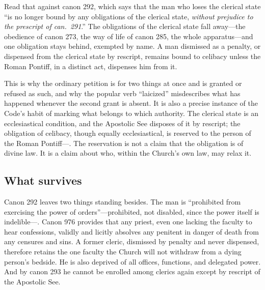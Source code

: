 Read that against canon 292, which says that the man who loses the clerical state ``is no longer bound by any obligations of the clerical state, \emph{without prejudice to the prescript of can.~291}.'' The obligations of the clerical state fall away---the obedience of canon 273, the way of life of canon 285, the whole apparatus---and one obligation stays behind, exempted by name. A man dismissed as a penalty, or dispensed from the clerical state by rescript, remains bound to celibacy unless the Roman Pontiff, in a distinct act, dispenses him from it.

This is why the ordinary petition is for two things at once and is granted or refused as such, and why the popular verb ``laicized'' misdescribes what has happened whenever the second grant is absent. It is also a precise instance of the Code's habit of marking what belongs to which authority. The clerical state is an ecclesiastical condition, and the Apostolic See disposes of it by rescript; the obligation of celibacy, though equally ecclesiastical, is reserved to the person of the Roman Pontiff---. The reservation is not a claim that the obligation is of divine law. It is a claim about who, within the Church's own law, may relax it.

\subsection{What survives}

Canon 292 leaves two things standing besides. The man is ``prohibited from exercising the power of orders''---prohibited, not disabled, since the power itself is indelible---. Canon 976 provides that any priest, even one lacking the faculty to hear confessions, validly and licitly absolves any penitent in danger of death from any censures and sins. A former cleric, dismissed by penalty and never dispensed, therefore retains the one faculty the Church will not withdraw from a dying person's bedside. He is also deprived  of all offices, functions, and delegated power. And by canon 293 he cannot be enrolled among clerics again except by rescript of the Apostolic See.

